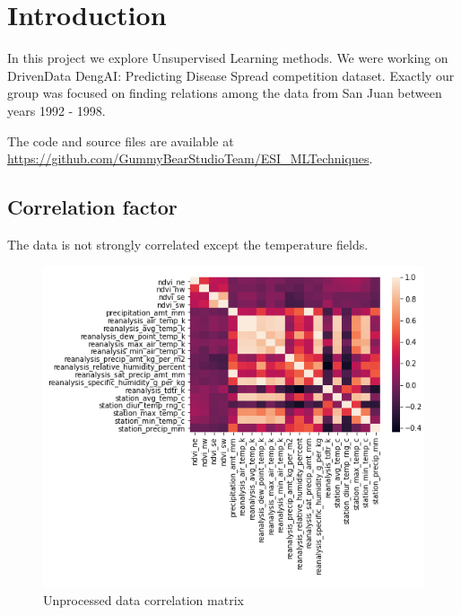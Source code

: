 \documentclass[sigconf]{acmart}
\begin{document}
%
%

\section{Introduction}
In this project we explore Unsupervised Learning methods.
We were working on DrivenData DengAI: Predicting Disease Spread competition dataset.
Exactly our group was focused on finding relations among the data from San Juan between years 1992 - 1998.

The code and source files are available at  \url{https://github.com/GummyBearStudioTeam/ESI_MLTechniques}.

\subsection{Correlation factor}
The data is not strongly correlated except the temperature fields.

\begin{figure}[h]
    \includegraphics[width=\linewidth]{correlation.png}
    \centering
    \caption{Unprocessed data correlation matrix}
\end{figure}
\end{document}
